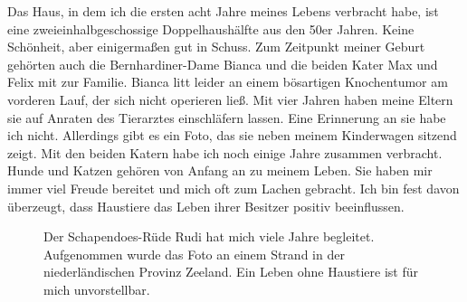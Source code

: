 \documentclass[fontsize=14pt,a4paper,headinclude,DIV=calc,automark]{scrbook}
\begin{document}
Das Haus, in dem ich die ersten acht Jahre meines Lebens verbracht habe, ist eine zweieinhalbgeschossige Doppelhaushälfte aus den 50er Jahren. Keine Schönheit, aber einigermaßen gut in Schuss. Zum Zeitpunkt meiner Geburt gehörten auch die Bernhardiner-Dame Bianca und die beiden Kater Max und Felix mit zur Familie. Bianca litt leider an einem bösartigen Knochentumor am vorderen Lauf, der sich nicht operieren ließ. Mit vier Jahren haben meine Eltern sie auf Anraten des Tierarztes einschläfern lassen. Eine Erinnerung an sie habe ich nicht. Allerdings gibt es ein Foto, das sie neben meinem Kinderwagen sitzend zeigt. Mit den beiden Katern habe ich noch einige Jahre zusammen verbracht. Hunde und Katzen gehören von Anfang an zu meinem Leben. Sie haben mir immer viel Freude bereitet und mich oft zum Lachen gebracht. Ich bin fest davon überzeugt, dass Haustiere das Leben ihrer Besitzer positiv beeinflussen.

\setlength{\fboxsep}{0pt}    %
\setlength{\fboxrule}{0.2pt} %
\begin{figure}[ht]
    \centering
    \caption{Der Schapendoes-Rüde Rudi hat mich viele Jahre begleitet. Aufgenommen wurde das Foto an einem Strand in der niederländischen Provinz Zeeland. Ein Leben ohne Haustiere ist für mich unvorstellbar.}
    \label{fig:zeltgemeinschaft}
\end{figure}
\end{document}
